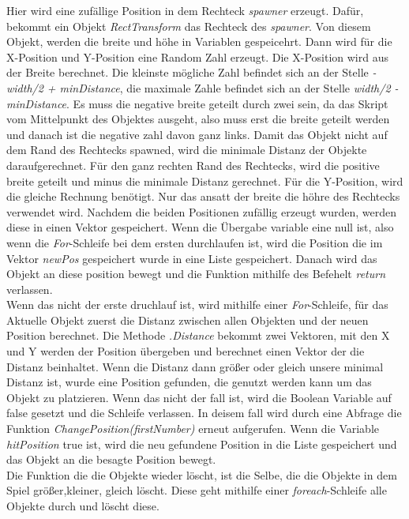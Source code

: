 Hier wird eine zufällige Position in dem Rechteck \textit{spawner} erzeugt. Dafür, bekommt ein Objekt \textit{RectTransform} das Rechteck des \textit{spawner}. Von diesem Objekt, werden die breite und höhe in Variablen gespeicehrt. Dann wird für die X-Position und Y-Position eine Random Zahl erzeugt. Die X-Position wird aus der Breite berechnet. Die kleinste mögliche Zahl befindet sich an der Stelle \textit{-width/2 + minDistance}, die maximale Zahle befindet sich an der Stelle \textit{width/2 - minDistance}. Es muss die negative breite geteilt durch zwei sein, da das Skript vom Mittelpunkt des Objektes ausgeht, also muss erst die breite geteilt werden und danach ist die negative zahl davon ganz links. Damit das Objekt nicht auf dem Rand des Rechtecks spawned, wird die minimale Distanz der Objekte daraufgerechnet. Für den ganz rechten Rand des Rechtecks, wird die positive breite geteilt und minus die minimale Distanz gerechnet. Für die Y-Position, wird die gleiche Rechnung benötigt. Nur das ansatt der breite die höhre des Rechtecks verwendet wird. Nachdem die beiden Positionen zufällig erzeugt wurden, werden diese in einen Vektor gespeichert. Wenn die Übergabe variable eine null ist, also wenn die \textit{For}-Schleife bei dem ersten durchlaufen ist, wird die Position die im Vektor \textit{newPos} gespeichert wurde in eine Liste gespeichert. Danach wird das Objekt an diese position bewegt und die Funktion mithilfe des Befehelt \textit{return} verlassen.\\
Wenn das nicht der erste druchlauf ist, wird mithilfe einer \textit{For}-Schleife, für das Aktuelle Objekt zuerst die Distanz zwischen allen Objekten und der neuen Position berechnet. Die Methode \textit{.Distance} bekommt zwei Vektoren, mit den X und Y werden der Position übergeben und berechnet einen Vektor der die Distanz beinhaltet. Wenn die Distanz dann größer oder gleich unsere minimal Distanz ist, wurde eine Position gefunden, die genutzt werden kann um das Objekt zu platzieren. Wenn das nicht der fall ist, wird die Boolean Variable auf false gesetzt und die Schleife verlassen. In deisem fall wird durch eine Abfrage die Funktion \textit{ChangePosition(firstNumber)} erneut aufgerufen. Wenn die Variable \textit{hitPosition} true ist, wird die neu gefundene Position in die Liste gespeichert und das Objekt an die besagte Position bewegt.\\
Die Funktion die die Objekte wieder löscht, ist die Selbe, die die Objekte in dem Spiel größer,kleiner, gleich löscht. Diese geht mithilfe einer \textit{foreach}-Schleife alle Objekte durch und löscht diese.\\
